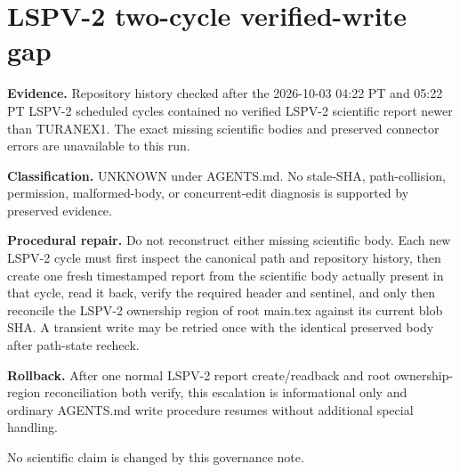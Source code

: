 \documentclass[11pt]{article}
\begin{document}
\section*{LSPV-2 two-cycle verified-write gap}
\textbf{Evidence.} Repository history checked after the 2026-10-03 04:22 PT and 05:22 PT LSPV-2 scheduled cycles contained no verified LSPV-2 scientific report newer than TURANEX1. The exact missing scientific bodies and preserved connector errors are unavailable to this run.

\textbf{Classification.} UNKNOWN under AGENTS.md. No stale-SHA, path-collision, permission, malformed-body, or concurrent-edit diagnosis is supported by preserved evidence.

\textbf{Procedural repair.} Do not reconstruct either missing scientific body. Each new LSPV-2 cycle must first inspect the canonical path and repository history, then create one fresh timestamped report from the scientific body actually present in that cycle, read it back, verify the required header and sentinel, and only then reconcile the LSPV-2 ownership region of root main.tex against its current blob SHA. A transient write may be retried once with the identical preserved body after path-state recheck.

\textbf{Rollback.} After one normal LSPV-2 report create/readback and root ownership-region reconciliation both verify, this escalation is informational only and ordinary AGENTS.md write procedure resumes without additional special handling.

No scientific claim is changed by this governance note.
\end{document}
